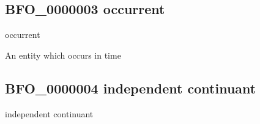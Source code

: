 \documentclass[letterpaper,10pt,english]{sphinxmanual}
\begin{document}
\subsection{BFO\_0000003 \sphinxhyphen{} occurrent}
\label{\detokenize{doc-BFO_0000003:bfo-0000003-occurrent}}\label{\detokenize{doc-BFO_0000003:index-0}}\label{\detokenize{doc-BFO_0000003::doc}}
\begin{sphinxShadowBox}

\sphinxAtStartPar
occurrent
\end{sphinxShadowBox}

\begin{sphinxShadowBox}

\sphinxAtStartPar
{\hyperref[\detokenize{doc-BFO_0000001::doc}]{}}
\end{sphinxShadowBox}

\begin{sphinxShadowBox}

\sphinxAtStartPar
An entity which occurs in time
\end{sphinxShadowBox}

\begin{sphinxShadowBox}

\sphinxAtStartPar
{}
\end{sphinxShadowBox}
\begin{quote}

\ignorespaces \end{quote}


\subsection{BFO\_0000004 \sphinxhyphen{} independent continuant}
\label{\detokenize{doc-BFO_0000004:bfo-0000004-independent-continuant}}\label{\detokenize{doc-BFO_0000004:index-0}}\label{\detokenize{doc-BFO_0000004::doc}}
\begin{sphinxShadowBox}

\sphinxAtStartPar
independent continuant
\end{sphinxShadowBox}
\end{document}
